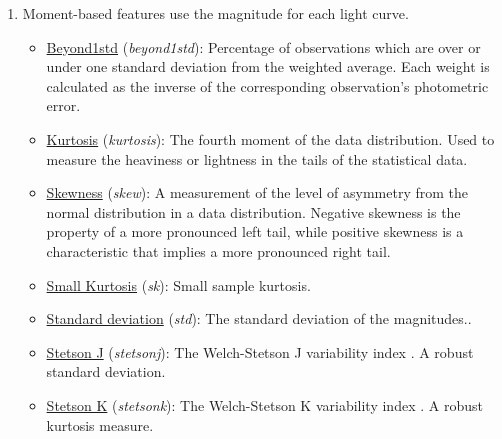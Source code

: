 \documentclass[a4paper,fleqn,usenatbib]{mnras}
\begin{document}
\begin{enumerate}
    
    \item Moment-based features use the magnitude for each light curve.
    \begin{itemize}
        \item \underline{Beyond1std} (\textit{beyond1std}): 
        Percentage of observations which are over or under one standard deviation from the weighted average. Each weight is calculated as the inverse of the corresponding observation's photometric error.
        \item \underline{Kurtosis} (\textit{kurtosis}): 
        The fourth moment of the data distribution. Used to measure the heaviness or lightness in the tails of the statistical data.
        \item \underline{Skewness} (\textit{skew}): 
        A measurement of the level of asymmetry from the normal distribution in a data distribution. Negative skewness is the property of a more pronounced left tail, while positive skewness is a characteristic that implies a more pronounced right tail.
        \item \underline{Small Kurtosis} (\textit{sk}):
        Small sample kurtosis.
        \item \underline{Standard deviation} (\textit{std}):
        The standard deviation of the magnitudes..
        \item \underline{Stetson J} (\textit{stetson\textunderscore j}):
        The Welch-Stetson J variability index \cite{1996PASP..108..851S}. A robust standard deviation.
        \item \underline{Stetson K} (\textit{stetson\textunderscore k}): 
        The Welch-Stetson K variability index \cite{1996PASP..108..851S}. A robust kurtosis measure.
    \end{itemize}
    

\end{enumerate}
\end{document}
